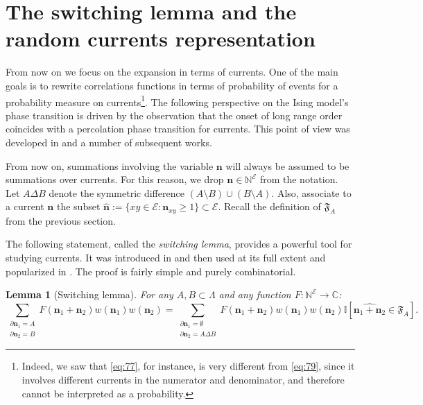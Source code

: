 \documentclass[a4paper,oneside,11pt]{article}
\newtheorem{lemma}[theorem]{Lemma}
\newcommand{\ee}{\end{equation}}
\newcommand{\be}{\begin{equation}}
\begin{document}
\section{The switching lemma and the random currents representation}

From now on we focus on the expansion in terms of currents. One of the main goals is to rewrite correlations functions in terms of probability of events for a probability measure on currents\footnote{Indeed, we saw that \eqref{eq:77}, for instance, is very different from \eqref{eq:79}, since it involves different currents in the numerator and denominator, and therefore cannot be interpreted as a probability.}. The following perspective on the Ising model's phase transition  is driven by the observation that the onset of long range order coincides with a percolation phase transition for currents.   This point of  view
was developed in \cite{Aiz82} and a number of subsequent works. 

From now on, summations involving the variable $\mathbf n$ will always be assumed to be summations over currents. For this reason, we drop $\mathbf n\in \mathbb N^{\mathcal E}$ from the notation. Let $A\Delta B$ denote the symmetric difference $(A\setminus B)\cup(B\setminus A)$. 
Also, associate  to a current $\mathbf n$ the subset $\widehat {\mathbf n}:=\{xy\in\mathcal E:\mathbf n_{xy}\ge1\}\subset \mathcal E$. Recall the definition of $\mathfrak F_A$ from the previous section.


The following statement, called the {\em switching lemma}, provides a powerful tool for studying currents. It was introduced in \cite{GriHurShe70} and then used at its full extent and popularized in \cite{Aiz82}. The proof is fairly simple and purely combinatorial. 
\begin{lemma}[Switching lemma]\label{switching}
For any $A,B\subset \Lambda$  and any function
 $F:\mathbb N^{\mathcal E}\rightarrow \mathbb C$: 
\be\nonumber
\sum_{\substack{\partial {\mathbf n}_1=A\\ \partial {\mathbf n}_2=B}}F({\mathbf n}_1+{\mathbf n} _2)w({\mathbf n}_1)w({\mathbf n}_2)=\sum_{\substack{\partial {\mathbf n}_1=\emptyset\\ \partial {\mathbf n}_2=A\Delta B}}F({\mathbf n}_1+{\mathbf n} _2)w({\mathbf n}_1)w({\mathbf n}_2){\mathbb  I}[\widehat{{\mathbf n}_1+{\mathbf n} _2}\in\mathfrak F_A].\ee
\end{lemma}  
\end{document}
